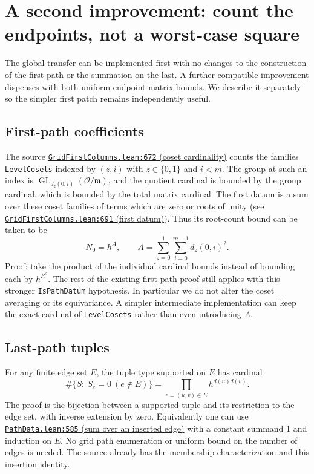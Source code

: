 \documentclass[11pt]{article}
\newcommand{\code}[1]{\texttt{#1}}
\newcommand{\base}{https://github.com/VladimirReshetnikov/ProveIt/blob/835c3695d07c0f77060c5cc63f92eeb52a7d21c2/Analysis/GeneralizedRiemannHypothesis}
\newcommand{\auxlink}[3]{\href{\base/Lean/grh/src/New/Determinant/AuxiliaryForms/#1.lean\#L#2}{\texttt{#1.lean:#2} (#3)}}
\begin{document}
\section{A second improvement: count the endpoints, not a worst-case square}
The global transfer can be implemented first with no changes to the construction of the first path or the summation on the last. A further compatible improvement dispenses with both uniform endpoint matrix bounds. We describe it separately so the simpler first patch remains independently useful.

\subsection{First-path coefficients}
The source \auxlink{GridFirstColumns}{672}{coset cardinality} counts the families \code{LevelCosets} indexed by $(z,i)$ with $z\in\{0,1\}$ and $i<m$. The group at such an index is $\operatorname{GL}_{d_z(0,i)}(\mathcal O/\mathfrak m)$, and the quotient cardinal is bounded by the group cardinal, which is bounded by the total matrix cardinal. The first datum is a sum over these coset families of terms which are zero or roots of unity (see \auxlink{GridFirstColumns}{691}{first datum}). Thus its root-count bound can be taken to be
\[
N_0=h^A,\qquad A=\sum_{z=0}^1\sum_{i=0}^{m-1} d_z(0,i)^2.
\]
Proof: take the product of the individual cardinal bounds instead of bounding each by $h^{R^2}$. The rest of the existing first-path proof still applies with this stronger \code{IsPathDatum} hypothesis. In particular we do not alter the coset averaging or its equivariance. A simpler intermediate implementation can keep the exact cardinal of \code{LevelCosets} rather than even introducing $A$.

\subsection{Last-path tuples}
For any finite edge set $E$, the tuple type supported on $E$ has cardinal
\begin{equation}\label{eq:tuplecount}
\#\{S:\ S_e=0\ (e\notin E)\}
=\prod_{e=(u,v)\in E}h^{d(u)d(v)}.
\end{equation}
The proof is the bijection between a supported tuple and its restriction to the edge set, with inverse extension by zero. Equivalently one can use \auxlink{PathData}{585}{sum over an inserted edge} with a constant summand 1 and induction on $E$. No grid path enumeration or uniform bound on the number of edges is needed. The source already has the membership characterization and this insertion identity.
\end{document}

